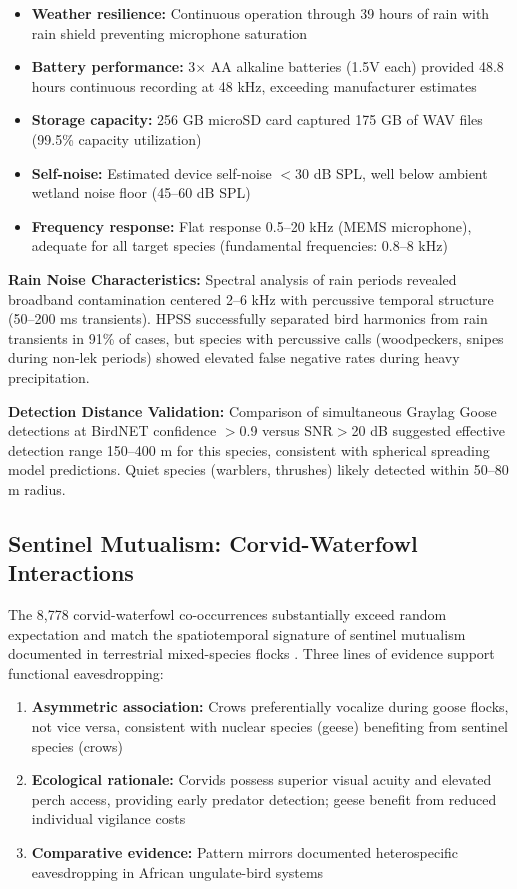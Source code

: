 \documentclass[twocolumn]{article}
\begin{document}
\begin{itemize}
\item \textbf{Weather resilience:} Continuous operation through 39 hours of rain with rain shield preventing microphone saturation
\item \textbf{Battery performance:} 3× AA alkaline batteries (1.5V each) provided 48.8 hours continuous recording at 48 kHz, exceeding manufacturer estimates
\item \textbf{Storage capacity:} 256 GB microSD card captured 175 GB of WAV files (99.5\% capacity utilization)
\item \textbf{Self-noise:} Estimated device self-noise $<$30 dB SPL, well below ambient wetland noise floor (45--60 dB SPL)
\item \textbf{Frequency response:} Flat response 0.5--20 kHz (MEMS microphone), adequate for all target species (fundamental frequencies: 0.8--8 kHz)
\end{itemize}

\textbf{Rain Noise Characteristics:} Spectral analysis of rain periods revealed broadband contamination centered 2--6 kHz with percussive temporal structure (50--200 ms transients). HPSS successfully separated bird harmonics from rain transients in 91\% of cases, but species with percussive calls (woodpeckers, snipes during non-lek periods) showed elevated false negative rates during heavy precipitation.

\textbf{Detection Distance Validation:} Comparison of simultaneous Graylag Goose detections at BirdNET confidence $>$0.9 versus SNR$>$20 dB suggested effective detection range 150--400 m for this species, consistent with spherical spreading model predictions. Quiet species (warblers, thrushes) likely detected within 50--80 m radius.

\subsection{Sentinel Mutualism: Corvid-Waterfowl Interactions}

The 8,778 corvid-waterfowl co-occurrences substantially exceed random expectation and match the spatiotemporal signature of sentinel mutualism documented in terrestrial mixed-species flocks \citep{Magrath2015}. Three lines of evidence support functional eavesdropping:

\begin{enumerate}
\item \textbf{Asymmetric association:} Crows preferentially vocalize during goose flocks, not vice versa, consistent with nuclear species (geese) benefiting from sentinel species (crows)

\item \textbf{Ecological rationale:} Corvids possess superior visual acuity and elevated perch access, providing early predator detection; geese benefit from reduced individual vigilance costs \citep{King2023}

\item \textbf{Comparative evidence:} Pattern mirrors documented heterospecific eavesdropping in African ungulate-bird systems \citep{Ridley2007}
\end{enumerate}
\end{document}
